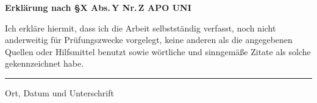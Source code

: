 \label{erklaerung}
\vspace*{1cm}

\vspace{1cm}

\Large{\textbf{Erklärung nach \S X Abs.\,Y Nr.\,Z APO UNI}}
\normalsize
\vspace{1cm}

Ich erkläre hiermit, dass ich die Arbeit selbstständig verfasst, noch nicht anderweitig für
Prüfungszwecke vorgelegt, keine anderen als die angegebenen Quellen oder Hilfsmittel
benutzt sowie wörtliche und sinngemäße Zitate als solche gekennzeichnet habe.

\vspace*{3.5cm}


\rule{1.0\textwidth}{0.4pt}

Ort, Datum und Unterschrift\\
